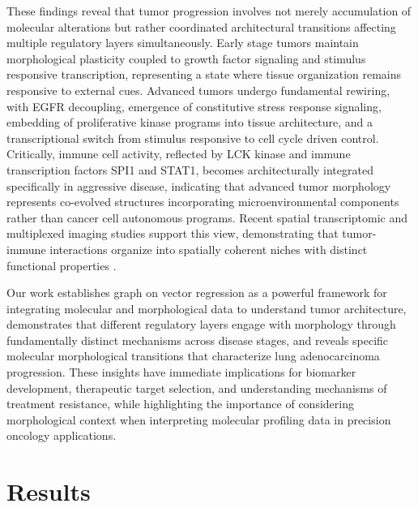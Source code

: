 \documentclass[pdflatex,article,12pt]{article}
\begin{document}
These findings reveal that tumor progression involves not merely accumulation of molecular alterations but rather coordinated architectural transitions affecting multiple regulatory layers simultaneously. Early stage tumors maintain morphological plasticity coupled to growth factor signaling and stimulus responsive transcription, representing a state where tissue organization remains responsive to external cues. Advanced tumors undergo fundamental rewiring, with EGFR decoupling, emergence of constitutive stress response signaling, embedding of proliferative kinase programs into tissue architecture, and a transcriptional switch from stimulus responsive to cell cycle driven control. Critically, immune cell activity, reflected by LCK kinase and immune transcription factors SPI1 and STAT1, becomes architecturally integrated specifically in aggressive disease, indicating that advanced tumor morphology represents co-evolved structures incorporating microenvironmental components rather than cancer cell autonomous programs. Recent spatial transcriptomic and multiplexed imaging studies support this view, demonstrating that tumor-immune interactions organize into spatially coherent niches with distinct functional properties \cite{van2023spatial,hu2024spatiotemporal}.

Our work establishes graph on vector regression as a powerful framework for integrating molecular and morphological data to understand tumor architecture, demonstrates that different regulatory layers engage with morphology through fundamentally distinct mechanisms across disease stages, and reveals specific molecular morphological transitions that characterize lung adenocarcinoma progression. These insights have immediate implications for biomarker development, therapeutic target selection, and understanding mechanisms of treatment resistance, while highlighting the importance of considering morphological context when interpreting molecular profiling data in precision oncology applications.


\section{Results}
\end{document}
